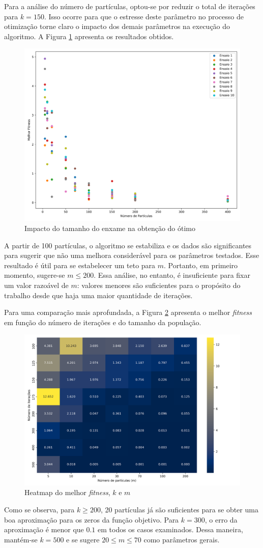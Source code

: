 \documentclass[12pt]{article}
\begin{document}
	Para a análise do número de partículas, optou-se por reduzir o total de iterações para $k=150$. Isso ocorre para que o estresse deste parâmetro no processo de otimização torne claro o impacto dos demais parâmetros na execução do algoritmo. A Figura \ref{fig_variandom} apresenta os resultados obtidos. 
	 
	\begin{figure}[h]
		\centering
		\includegraphics[width=0.7\linewidth]{../variando_m}
		\caption{Impacto do tamanho do enxame na obtenção do ótimo}
		\label{fig_variandom}
	\end{figure}
	A partir de 100 partículas, o algoritmo se estabiliza e os dados são significantes para sugerir que não uma melhora considerável para os parâmetros testados. Esse resultado é útil para se estabelecer um teto para $m$. Portanto, em primeiro momento, sugere-se $m \leq 200$. Essa análise, no entanto, é insuficiente para fixar um valor razoável de $m$: valores menores são suficientes para o propósito do trabalho desde que haja uma maior quantidade de iterações. 
	
	Para uma comparação mais aprofundada, a Figura \ref{fig_heatmapfitness} apresenta o melhor \textit{fitness} em função do número de iterações e do tamanho da população. 
	\begin{figure}[h!]
		\centering
		\includegraphics[width=0.7\linewidth]{../heatmap_fitness_novo}
		\caption{Heatmap do melhor \textit{fitness}, $k$ e $m$}
		\label{fig_heatmapfitness}
	\end{figure}
	
	Como se observa, para $k \geq 200$, 20 partículas já são suficientes para se obter uma boa aproximação para os zeros da função objetivo. Para $k=300$, o erro da aproximação é menor que $0.1$ em todos os casos examinados. Dessa maneira, mantém-se $k=500$ e se sugere $  20 \leq m \leq 70 $ como parâmetros gerais. 
	
\end{document}
